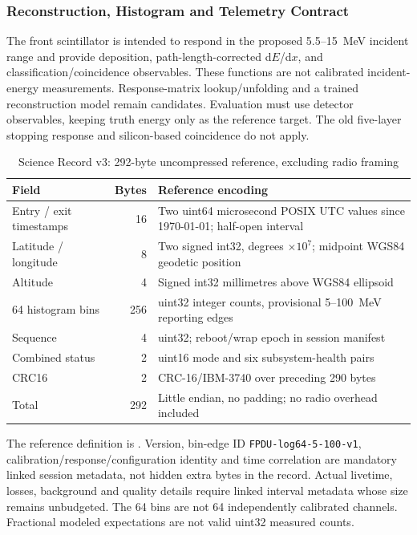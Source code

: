 \subsubsection{Reconstruction, Histogram and Telemetry Contract}\label{app:payload-coincidence}\label{app:payload-readout}
The front scintillator is intended to respond in the proposed 5.5--15~MeV incident range and provide deposition, path-length-corrected d$E$/d$x$, and classification/coincidence observables. These functions are not calibrated incident-energy measurements. Response-matrix lookup/unfolding and a trained reconstruction model remain candidates. Evaluation must use detector observables, keeping truth energy only as the reference target. The old five-layer stopping response and silicon-based coincidence do not apply.

\begin{table}[H]\centering\small
\caption{Science Record v3: 292-byte uncompressed reference, excluding radio framing}\label{tab:fpdu-telemetry}
\begin{tabularx}{\linewidth}{@{}p{3.6cm}rX@{}}\toprule
Field & Bytes & Reference encoding\\\midrule
Entry / exit timestamps & 16 & Two uint64 microsecond POSIX UTC values since 1970-01-01; half-open interval\\
Latitude / longitude & 8 & Two signed int32, degrees $\times10^7$; midpoint WGS84 geodetic position\\
Altitude & 4 & Signed int32 millimetres above WGS84 ellipsoid\\
64 histogram bins & 256 & uint32 integer counts, provisional 5--100~MeV reporting edges\\
Sequence & 4 & uint32; reboot/wrap epoch in session manifest\\
Combined status & 2 & uint16 mode and six subsystem-health pairs\\
CRC16 & 2 & CRC-16/IBM-3740 over preceding 290 bytes\\\midrule
Total & 292 & Little endian, no padding; no radio overhead included\\\bottomrule
\end{tabularx}\end{table}
The reference definition is . Version, bin-edge ID \texttt{FPDU-log64-5-100-v1}, calibration/response/configuration identity and time correlation are mandatory linked session metadata, not hidden extra bytes in the record. Actual livetime, losses, background and quality details require linked interval metadata whose size remains unbudgeted. The 64 bins are not 64 independently calibrated channels. Fractional modeled expectations are not valid uint32 measured counts.

